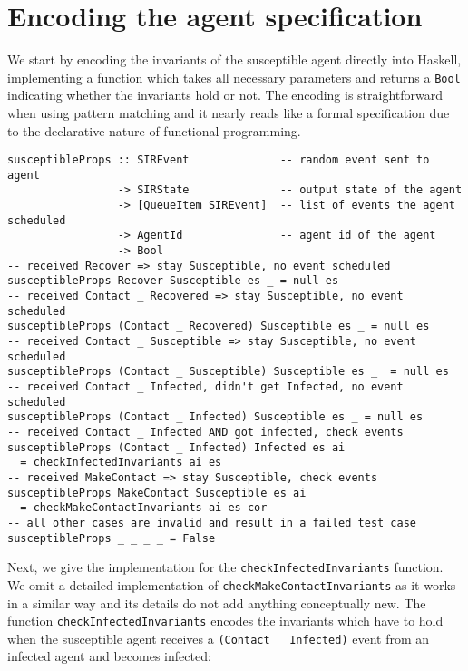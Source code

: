 \section{Encoding the agent specification}
\label{sec:method}
We start by encoding the invariants of the susceptible agent directly into Haskell, implementing a function which takes all necessary parameters and returns a \texttt{Bool} indicating whether the invariants hold or not. The encoding is straightforward when using pattern matching and it nearly reads like a formal specification due to the declarative nature of functional programming.

\begin{footnotesize}
\begin{verbatim}
susceptibleProps :: SIREvent              -- random event sent to agent
                 -> SIRState              -- output state of the agent
                 -> [QueueItem SIREvent]  -- list of events the agent scheduled
                 -> AgentId               -- agent id of the agent
                 -> Bool
-- received Recover => stay Susceptible, no event scheduled
susceptibleProps Recover Susceptible es _ = null es
-- received Contact _ Recovered => stay Susceptible, no event scheduled
susceptibleProps (Contact _ Recovered) Susceptible es _ = null es
-- received Contact _ Susceptible => stay Susceptible, no event scheduled
susceptibleProps (Contact _ Susceptible) Susceptible es _  = null es
-- received Contact _ Infected, didn't get Infected, no event scheduled
susceptibleProps (Contact _ Infected) Susceptible es _ = null es
-- received Contact _ Infected AND got infected, check events
susceptibleProps (Contact _ Infected) Infected es ai
  = checkInfectedInvariants ai es
-- received MakeContact => stay Susceptible, check events
susceptibleProps MakeContact Susceptible es ai
  = checkMakeContactInvariants ai es cor
-- all other cases are invalid and result in a failed test case
susceptibleProps _ _ _ _ = False
\end{verbatim}
\end{footnotesize}

Next, we give the implementation for the \texttt{checkInfectedInvariants} function. We omit a detailed implementation of \texttt{checkMakeContactInvariants} as it works in a similar way and its details do not add anything conceptually new. The function \texttt{checkInfectedInvariants} encodes the invariants which have to hold when the susceptible agent receives a \texttt{(Contact \_ Infected)} event from an infected agent and becomes infected:

